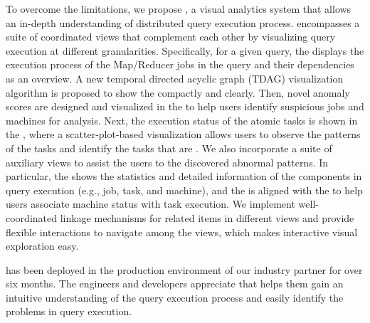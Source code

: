 To overcome the limitations, we propose \qevis{}, a visual analytics system that allows an in-depth understanding of distributed query execution process. 
\qevis{} encompasses a suite of coordinated views that complement each other by visualizing query execution at different granularities. 
Specifically, for a given query, the  displays the execution process of the Map/Reducer jobs in the query and their dependencies as an overview. A new temporal directed acyclic graph (TDAG) visualization algorithm is proposed to show the  compactly and clearly.
Then, novel anomaly scores are designed and visualized in the  to help users identify suspicious jobs and machines for analysis. 
Next, the execution status of the atomic tasks is shown in the , where a scatter-plot-based visualization allows users to observe the patterns of the tasks and identify the tasks that are .
We also incorporate a suite of auxiliary views to assist the users to  the discovered abnormal patterns.
In particular, the  shows the statistics and detailed information of the components in query execution (e.g., job, task, and machine), and the  is aligned with the  to help users associate machine status with task execution.
We implement well-coordinated linkage mechanisms for related items in different views and provide flexible interactions to navigate among the views, which makes interactive visual exploration easy.

\qevis{} has been deployed in the production environment of our industry partner for over six months. The engineers and developers appreciate that \qevis{} helps them gain an intuitive understanding of the query execution process and easily identify the problems in query execution. 

